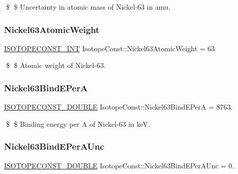 \$ \$ Uncertainty in atomic mass of Nickel-\/63 in amu. \mbox{\label{group___isotope_const-_nickel-_ni63_gac0ffc6936a079a6b1ced0f12f3fa5f6a}} 
\subsubsection{\texorpdfstring{Nickel63\+Atomic\+Weight}{Nickel63AtomicWeight}}
{\footnotesize\ttfamily \mbox{\hyperlink{group___isotope_const-_macros_ga5f18360b3e99483a35c32d789e62621c}{I\+S\+O\+T\+O\+P\+E\+C\+O\+N\+S\+T\+\_\+\+I\+NT}} Isotope\+Const\+::\+Nickel63\+Atomic\+Weight = 63}

\$ \$ Atomic weight of Nickel-\/63. \mbox{\label{group___isotope_const-_nickel-_ni63_gada87a4f274bcb7a3944d90b853775141}} 
\subsubsection{\texorpdfstring{Nickel63\+Bind\+E\+PerA}{Nickel63BindEPerA}}
{\footnotesize\ttfamily \mbox{\hyperlink{group___isotope_const-_macros_ga8f45a7272ce02c0b4c65c44636ed719a}{I\+S\+O\+T\+O\+P\+E\+C\+O\+N\+S\+T\+\_\+\+D\+O\+U\+B\+LE}} Isotope\+Const\+::\+Nickel63\+Bind\+E\+PerA = 8763.}

\$ \$ Binding energy per A of Nickel-\/63 in keV. \mbox{\label{group___isotope_const-_nickel-_ni63_ga3ef994d33f60f205b8c4ed4b515f77f7}} 
\subsubsection{\texorpdfstring{Nickel63\+Bind\+E\+Per\+A\+Unc}{Nickel63BindEPerAUnc}}
{\footnotesize\ttfamily \mbox{\hyperlink{group___isotope_const-_macros_ga8f45a7272ce02c0b4c65c44636ed719a}{I\+S\+O\+T\+O\+P\+E\+C\+O\+N\+S\+T\+\_\+\+D\+O\+U\+B\+LE}} Isotope\+Const\+::\+Nickel63\+Bind\+E\+Per\+A\+Unc = 0.}

